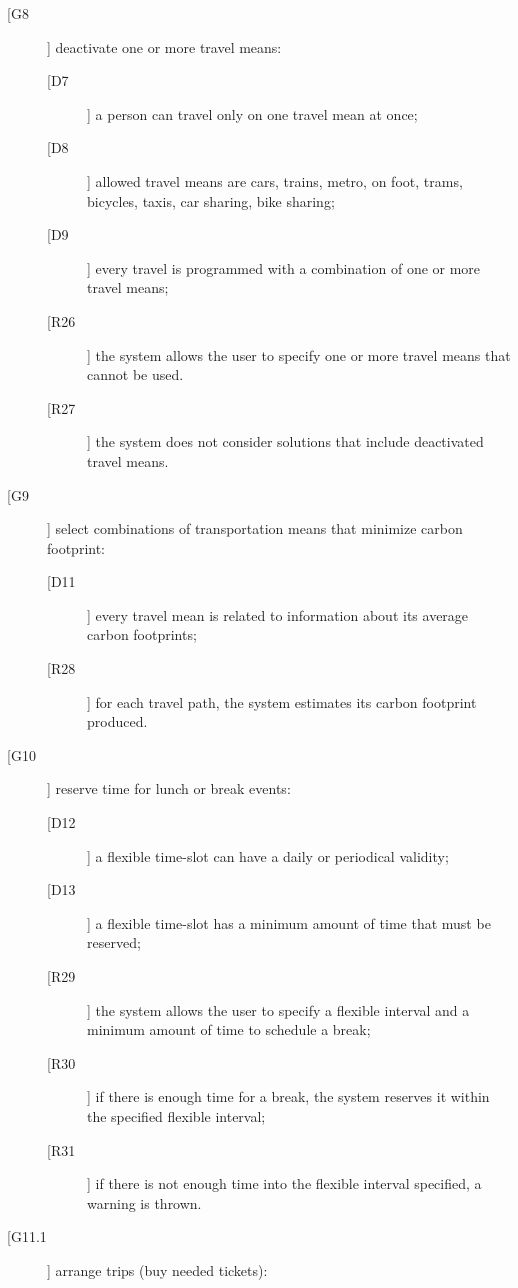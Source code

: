 \begin{description}
\begin{description}
	\end{description}
\item[[G8]] deactivate one or more travel means:
	\begin{description}
	\item[[D7]] a person can travel only on one travel mean at once; 
	\item[[D8]] allowed travel means are cars, trains, metro, on foot, trams, bicycles, taxis, car sharing, bike sharing;	
	\item[[D9]] every travel is programmed with a combination of one or more travel means;
	\newline
	\item[[R26]] the system allows the user to specify one or more travel means that cannot be used.
	\item[[R27]] the system does not consider solutions that include deactivated travel means.
	\end{description}
\item[[G9]] select combinations of transportation means that minimize carbon footprint:
	\begin{description}
	\item[[D11]] every travel mean is related to information about its average carbon footprints;
	\newline
	\item[[R28]] for each travel path, the system estimates its carbon footprint produced.
	\end{description}
\item[[G10]] reserve time for lunch or break events:
	\begin{description}
	\item[[D12]] a flexible time-slot can have a daily or periodical validity;
	\item[[D13]] a flexible time-slot has a minimum amount of time that must be reserved;
	\newline
	\item[[R29]] the system allows the user to specify a flexible interval and a minimum amount of time to schedule a break;
	\item[[R30]] if there is enough time for a break, the system reserves it within the specified flexible interval;
	\item[[R31]] if there is not enough time into the flexible interval specified, a warning is thrown.
	\end{description}
\item[[G11.1]] arrange trips (buy needed tickets):
	\begin{description}

\end{description}
\end{description}
